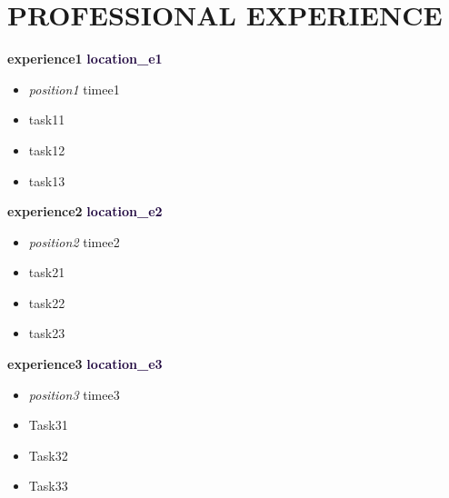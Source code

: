 \documentclass[a4paper,8pt]{article}
\begin{document}
\section{PROFESSIONAL EXPERIENCE}
\textbf{experience1} \hfill \textbf{\textcolor[HTML]{1C033C}{location\_e1}}\\[-3ex]
\begin{itemize}[label={\large\textbullet}, left=0pt, itemsep=0.5ex, parsep=0.5ex]
    \item \textit{position1} \hfill \color[HTML]{1C033C} timee1 \\[-3ex]

\end{itemize}
\begin{itemize}[label=$\circ$,itemsep=0.5ex,parsep=0.5ex]
    \item task11
    \item task12
    \item task13
\end{itemize}

\textbf{experience2} \hfill \textbf{\textcolor[HTML]{1C033C}{location\_e2}}\\[-3ex]
\begin{itemize}[label={\large\textbullet}, left=0pt, itemsep=0.5ex, parsep=0.5ex]
    \item \textit{position2} \hfill \color[HTML]{1C033C} timee2 \\[-3ex]

\end{itemize}
\begin{itemize}[label=$\circ$,itemsep=0.5ex,parsep=0.5ex]
    \item task21
    \item task22
    \item task23
\end{itemize}

\textbf{experience3} \hfill \textbf{\textcolor[HTML]{1C033C}{location\_e3}}\\[-3ex]
\begin{itemize}[label={\large\textbullet}, left=0pt, itemsep=0.5ex, parsep=0.5ex]
    \item \textit{position3} \hfill \color[HTML]{1C033C} timee3 \\[-3ex]

\end{itemize}
\begin{itemize}[label=$\circ$,itemsep=0.5ex,parsep=0.5ex]
    \item Task31
    \item Task32
    \item Task33
\end{itemize}
\end{document}
